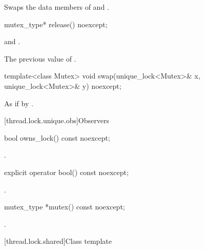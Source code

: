 \begin{itemdescr}
\pnum
\effects
Swaps the data members of  and .
\end{itemdescr}

%
\begin{itemdecl}
mutex_type* release() noexcept;
\end{itemdecl}

\begin{itemdescr}
\pnum
\ensures
{} and .

\pnum
\returns
The previous value of .
\end{itemdescr}

%
\begin{itemdecl}
template<class Mutex>
  void swap(unique_lock<Mutex>& x, unique_lock<Mutex>& y) noexcept;
\end{itemdecl}

\begin{itemdescr}
\pnum
\effects
As if by .
\end{itemdescr}

[thread.lock.unique.obs]{Observers}

%
\begin{itemdecl}
bool owns_lock() const noexcept;
\end{itemdecl}

\begin{itemdescr}
\pnum
\returns
{}.
\end{itemdescr}

%
\begin{itemdecl}
explicit operator bool() const noexcept;
\end{itemdecl}

\begin{itemdescr}
\pnum
\returns
{}.
\end{itemdescr}

%
\begin{itemdecl}
mutex_type *mutex() const noexcept;
\end{itemdecl}

\begin{itemdescr}
\pnum
\returns
{}.
\end{itemdescr}

[thread.lock.shared]{Class template }


